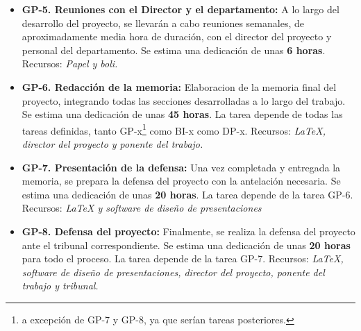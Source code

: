 \begin{itemize}
    \newline La tarea depende de las tareas GP-1, GP-2 y GP-3.
    \newline Recursos: \textit {LaTeX, director del proyecto y tutor de GEP.}
    \item \textbf{GP-5. Reuniones con el Director y el departamento:} A lo largo del desarrollo del proyecto, se llevarán 
    a cabo reuniones semanales, de aproximadamente media hora de duración, con el director del proyecto y personal del 
    departamento. Se estima una dedicación de unas \textbf{6 horas}. 
    \newline Recursos: \textit {Papel y boli.}
    \item \textbf{GP-6. Redacción de la memoria:} Elaboracion de la memoria final del proyecto, integrando todas las secciones
    desarrolladas a lo largo del trabajo. Se estima una dedicación de unas \textbf{45 horas}.
    \newline La tarea depende de todas las tareas definidas, tanto GP-x\footnote{a excepción de GP-7 y GP-8, ya que serían tareas 
    posteriores.} como BI-x como DP-x.
    \newline Recursos: \textit {LaTeX, director del proyecto y ponente del trabajo.}
    \item \textbf{GP-7. Presentación de la defensa:} Una vez completada y entregada la memoria, se prepara la defensa del proyecto 
    con la antelación necesaria. Se estima una dedicación de unas \textbf{20 horas}.
    \newline La tarea depende de la tarea GP-6.
    \newline Recursos: \textit {LaTeX y software de diseño de presentaciones}
    \item \textbf{GP-8. Defensa del proyecto:}
    Finalmente, se realiza la defensa del proyecto ante el tribunal correspondiente. Se estima una dedicación de unas \textbf{20 horas} 
    para todo el proceso.
    \newline La tarea depende de la tarea GP-7.
    \newline Recursos: \textit {LaTeX, software de diseño de presentaciones, director del proyecto, ponente del trabajo y tribunal.}
\end{itemize}